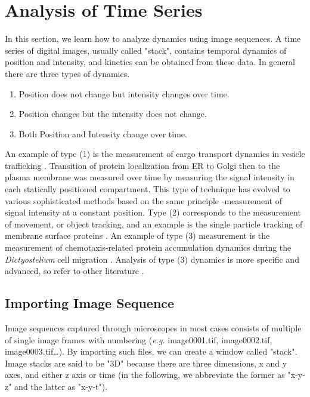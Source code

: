 
\section{Analysis of Time Series }
\label{sec:timeseries}

In this section, we learn how to analyze dynamics using image sequences.
A time series of digital images, usually called
"stack", contains temporal dynamics of
position and intensity, and kinetics can be obtained from these data.
In general there are three types of dynamics.

\begin{enumerate}
\item Position does not change but intensity changes over time. 
\item Position changes but the intensity does not change. 
\item Both Position and Intensity change over time. 
\end{enumerate}

An example of type (1) is the measurement of cargo transport dynamics in
vesicle trafficking \citep{hirschbergJCB1998}. Transition of protein
localization from ER to Golgi then to the plasma membrane was measured
over time by measuring the signal intensity in each statically
positioned compartment. This type of technique has evolved to various
sophisticated methods based on the same principle -measurement of
signal intensity at a constant position. Type (2) corresponds to the
measurement of movement, or object tracking, and an example is the
single particle tracking of membrane surface proteins \citep{muraseBJ2004}. An example of type (3) measurement is the measurement of
chemotaxis-related protein accumulation dynamics during the
\textit{Dictyostelium} cell migration \citep{Dormann2002}. Analysis
of type (3) dynamics is more specific and advanced, so refer to other
literature \citep{miuraABEB2005}.

\subsection{Importing Image Sequence}

Image sequences captured through microscopes in most cases consists of
multiple of single image frames with numbering (\textit{e.g.} image0001.tif, image0002.tif, image0003.tif\ldots). By
importing such files, we can create a window called
"stack". Image stacks are said to be "3D" because there are three
dimensions, x and y axes, and either z axis or time (in the following,
we abbreviate the former as "x-y-z" and the latter as "x-y-t"). 

